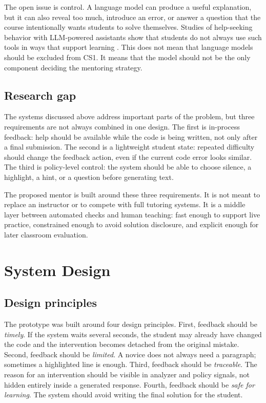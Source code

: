 \documentclass[11pt]{article}
\begin{document}
The open issue is control. A language model can produce a useful explanation, but it can also reveal too much, introduce an error, or answer a question that the course intentionally wants students to solve themselves. Studies of help-seeking behavior with LLM-powered assistants show that students do not always use such tools in ways that support learning \cite{PatternsofLLMPoweredProgrammingAssistant}. This does not mean that language models should be excluded from CS1. It means that the model should not be the only component deciding the mentoring strategy.

\subsection{Research gap}

The systems discussed above address important parts of the problem, but three requirements are not always combined in one design. The first is in-process feedback: help should be available while the code is being written, not only after a final submission. The second is a lightweight student state: repeated difficulty should change the feedback action, even if the current code error looks similar. The third is policy-level control: the system should be able to choose silence, a highlight, a hint, or a question before generating text.

The proposed mentor is built around these three requirements. It is not meant to replace an instructor or to compete with full tutoring systems. It is a middle layer between automated checks and human teaching: fast enough to support live practice, constrained enough to avoid solution disclosure, and explicit enough for later classroom evaluation.

\section{System Design}

\subsection{Design principles}

The prototype was built around four design principles. First, feedback should be \emph{timely}. If the system waits several seconds, the student may already have changed the code and the intervention becomes detached from the original mistake. Second, feedback should be \emph{limited}. A novice does not always need a paragraph; sometimes a highlighted line is enough. Third, feedback should be \emph{traceable}. The reason for an intervention should be visible in analyzer and policy signals, not hidden entirely inside a generated response. Fourth, feedback should be \emph{safe for learning}. The system should avoid writing the final solution for the student.
\end{document}
